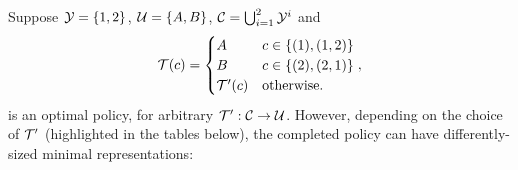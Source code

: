 \begin{example} \label{ex:complete}
Suppose $\mathcal{Y}=\{1,2\}$, $\mathcal{U}=\{A,B\}$, $\mathcal{C}=\bigcup_{i=1}^2\mathcal{Y}^i$ and 
$$\mathcal{T}(c) = \begin{cases}
A & c \in \{(1), (1,2)\}\\
B & c \in \{(2), (2,1)\}\\
\mathcal{T}^{\prime}(c) & \text{otherwise.}
\end{cases},$$
is an optimal policy, for arbitrary $\mathcal{T}^{\prime}:\mathcal{C}\to\mathcal{U}$. However, depending on the choice of $\mathcal{T}^{\prime}$ (highlighted in the tables below),
the completed policy can have differently-sized minimal representations:

\begin{figure}[h]
\begin{floatrow}
\quad
{}\quad\quad
{}
\end{floatrow}
\bigskip


\end{figure}
\end{example}
